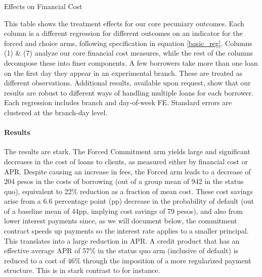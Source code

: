 \documentclass[12pt, a4paper]{article}
\begin{document}
\begin{table}
\caption{Effects on Financial Cost}
\label{main_impact_table}
\begin{center}
\resizebox{1.0\textwidth}{!}{
\footnotesize{}
}
\end{center}
\footnotesize{This table shows the treatment effects for our core pecuniary outcomes. Each column is a different regression for different outcomes on an indicator for the forced and choice arms, following specification in equation \ref{basic_reg}. Columns (1) \& (7) analyze our core financial cost measures, while the rest of the columns decompose these into finer components.
A few borrowers take more than one loan on the first day they appear in an experimental branch. These are treated as different observations. Additional results, available upon request, show that our results are robust to different ways of handling multiple loans for each borrower. Each regression includes branch and day-of-week FE. Standard errors are clustered at the branch-day level. }

\end{table}



\paragraph*{Results} The results are stark. The Forced Commitment arm yields large and significant decreases in the cost of loans to clients, as measured either by financial cost or APR. Despite causing an increase in fees, the Forced arm leads to a decrease of 204 pesos in the costs of borrowing (out of a group mean of 942 in the status quo), equivalent to 22\% reduction as a fraction of mean cost. These cost savings arise from a 6.6 percentage point (pp) decrease in the probability of default (out of a baseline mean of 44pp,  implying cost savings of 79 pesos), and also from lower interest payments since, as we will document below, the commitment contract speeds up payments so the interest rate applies to a smaller principal. This translates into a large reduction in APR. A credit product that has an effective average APR of 57\% in the status quo arm (inclusive of default) is reduced to a cost of 46\% through the imposition of a more regularized payment structure. This is in stark contrast to \cite{Pande} for instance.  
\end{document}
